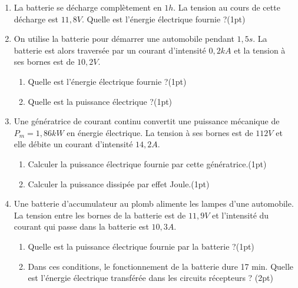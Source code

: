 \documentclass[12pt]{article}
\begin{document}
   \begin{enumerate}
   \item La batterie se décharge complètement en $1 h$. La tension au cours de cette décharge est $11,8 V$. Quelle est
     l’énergie électrique fournie ?\dotfill(1pt)
\item On utilise la batterie pour démarrer une automobile pendant $1,5 s$. La batterie est alors traversée par un
  courant d’intensité $0,2 kA$ et la tension à ses bornes est de $10,2 V$.
         \begin{enumerate}
           \item Quelle est l’énergie électrique fournie ?\dotfill(1pt)
           \item Quelle est la puissance électrique ?\dotfill(1pt)
         \end{enumerate}
       \item Une génératrice de courant continu convertit une puissance mécanique de $P_m= 1,86 kW$ en énergie électrique.
La tension à ses bornes est de $112V$ et elle débite un courant d’intensité $14,2 A$.
   \begin{enumerate}
     \item Calculer la puissance électrique fournie par cette génératrice.\dotfill(1pt)
     \item Calculer la puissance dissipée par effet Joule.\dotfill(1pt)
   \end{enumerate}
 \item Une batterie d’accumulateur au plomb alimente les lampes d’une automobile. La tension entre les bornes de la
batterie est de $11,9 V$ et l’intensité du courant qui passe dans la batterie est $10,3 A$.
   \begin{enumerate}

     \item Quelle est la puissance électrique fournie par la batterie ?\dotfill(1pt)

\item Dans ces conditions, le fonctionnement de la batterie dure 17 min. Quelle est l’énergie électrique transférée
  dans les circuits récepteurs ? \dotfill(2pt)
   \end{enumerate}
   \end{enumerate}
\end{document}
